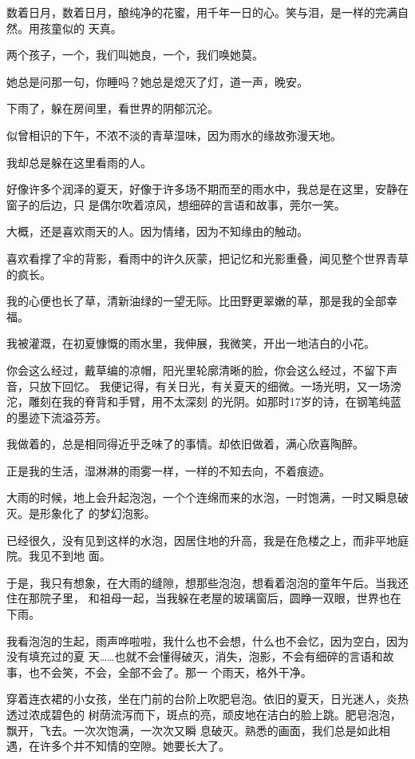 \documentclass[12pt,a4paper]{article}
\begin{document}
		数着日月，数着日月，酿纯净的花蜜，用千年一日的心。笑与泪，是一样的完满自然。用孩童似的
	天真。

		两个孩子，一个，我们叫她良，一个，我们唤她莫。

		她总是问那一句，你睡吗？她总是熄灭了灯，道一声，晚安。

	\endwriting



		下雨了，躲在房间里，看世界的阴郁沉沦。

		似曾相识的下午，不浓不淡的青草湿味，因为雨水的缘故弥漫天地。

		我却总是躲在这里看雨的人。

		好像许多个润泽的夏天，好像于许多场不期而至的雨水中，我总是在这里，安静在窗子的后边，只
	是偶尔吹着凉风，想细碎的言语和故事，莞尔一笑。

		大概，还是喜欢雨天的人。因为情绪，因为不知缘由的触动。

		喜欢看撑了伞的背影，看雨中的许久灰蒙，把记忆和光影重叠，闻见整个世界青草的疯长。

		我的心便也长了草，清新油绿的一望无际。比田野更翠嫩的草，那是我的全部幸福。

		我被灌溉，在初夏慷慨的雨水里，我伸展，我微笑，开出一地洁白的小花。

		你会这么经过，戴草编的凉帽，阳光里轮廓清晰的脸，你会这么经过，不留下声音，只放下回忆。
	我便记得，有关日光，有关夏天的细微。一场光明，又一场滂沱，雕刻在我的脊背和手臂，用不太深刻
	的光阴。如那时17岁的诗，在钢笔纯蓝的墨迹下流溢芬芳。

		我做着的，总是相同得近乎乏味了的事情。却依旧做着，满心欣喜陶醉。

		正是我的生活，湿淋淋的雨雾一样，一样的不知去向，不着痕迹。

		大雨的时候，地上会升起泡泡，一个个连绵而来的水泡，一时饱满，一时又瞬息破灭。是形象化了
	的梦幻泡影。

		已经很久，没有见到这样的水泡，因居住地的升高，我是在危楼之上，而非平地庭院。我见不到地
	面。

		于是，我只有想象，在大雨的缝隙，想那些泡泡，想看着泡泡的童年午后。当我还住在那院子里，
	和祖母一起，当我躲在老屋的玻璃窗后，圆睁一双眼，世界也在下雨。

		我看泡泡的生起，雨声哗啦啦，我什么也不会想，什么也不会忆，因为空白，因为没有填充过的夏
	天……也就不会懂得破灭，消失，泡影，不会有细碎的言语和故事，也不会笑，不会，全部不会了。那一
	个雨天，格外干净。

		穿着连衣裙的小女孩，坐在门前的台阶上吹肥皂泡。依旧的夏天，日光迷人，炎热透过浓成碧色的
	树荫流泻而下，斑点的亮，顽皮地在洁白的脸上跳。肥皂泡泡，飘开，飞去。一次次饱满，一次次又瞬
	息破灭。熟悉的画面，我们总是如此相遇，在许多个并不知情的空隙。她要长大了。
\end{document}
